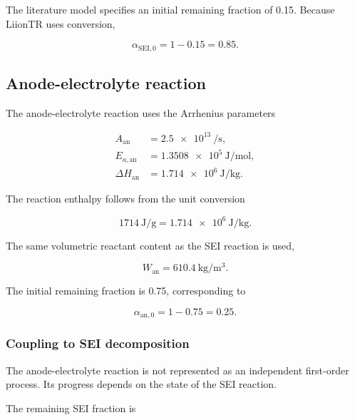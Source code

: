The literature model specifies an initial remaining fraction of 0.15.
Because LiionTR uses conversion,

\begin{equation}
    \alpha_{\mathrm{SEI},0}
    =
    1-0.15
    =
    0.85.
\end{equation}


\subsection{Anode-electrolyte reaction}

The anode-electrolyte reaction uses the Arrhenius parameters

\begin{align}
    A_{\mathrm{an}}
    &=
    \num{2.5e13}
    \ \si{\per\second},
    \\
    E_{a,\mathrm{an}}
    &=
    \num{1.3508e5}
    \ \si{\joule\per\mole},
    \\
    \Delta H_{\mathrm{an}}
    &=
    \num{1.714e6}
    \ \si{\joule\per\kilogram}.
\end{align}

The reaction enthalpy follows from the unit conversion

\begin{equation}
    \SI{1714}{\joule\per\gram}
    =
    \num{1.714e6}
    \ \si{\joule\per\kilogram}.
\end{equation}

The same volumetric reactant content as the SEI reaction is used,

\begin{equation}
    W_{\mathrm{an}}
    =
    \SI{610.4}{\kilogram\per\meter\cubed}.
\end{equation}

The initial remaining fraction is 0.75, corresponding to

\begin{equation}
    \alpha_{\mathrm{an},0}
    =
    1-0.75
    =
    0.25.
\end{equation}


\subsubsection{Coupling to SEI decomposition}

The anode-electrolyte reaction is not represented as an independent
first-order process. Its progress depends on the state of the SEI
reaction.

The remaining SEI fraction is

